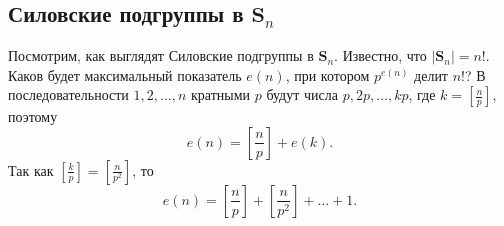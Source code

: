 \documentclass{article}
\begin{document}
\subsection{Силовские подгруппы в $\textbf{S}_n$}

Посмотрим, как выглядят Силовские подгруппы в $\mathbf{S}_n$. 
Известно, что $| \mathbf{S}_n | = n!$. Каков будет максимальный показатель $e(n)$, при котором $p^{e(n)}$ делит $n!$? В последовательности $1, 2, \ldots, n$ кратными $p$ будут числа $p, 2p, \ldots, kp$, где $k = \left[ \frac{n}{p} \right]$, поэтому $$ e(n) =  \left[ \frac{n}{p} \right] + e(k). $$ Так как $ \left[ \frac{k}{p} \right] =  \left[ \frac{n}{p^2} \right]$, то
\begin{equation} \label{eq_312}
    e(n) =  \left[ \frac{n}{p} \right] +  \left[ \frac{n}{p^2} \right] + \ldots + 1.
\end{equation}
\end{document}

